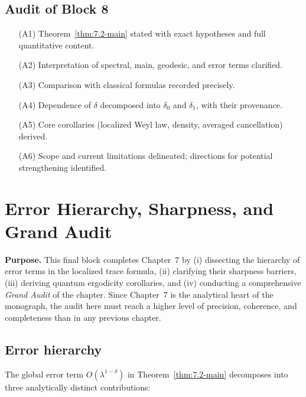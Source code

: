 \subsection{Audit of Block 8} \label{subsec:7.2-audit}

\begin{itemize}
  \item[(A1)] Theorem~\ref{thm:7.2-main} stated with exact hypotheses and full quantitative content.
  \item[(A2)] Interpretation of spectral, main, geodesic, and error terms clarified.
  \item[(A3)] Comparison with classical formulas recorded precisely.
  \item[(A4)] Dependence of \(\delta\) decomposed into \(\delta_0\) and \(\delta_1\), with their provenance.
  \item[(A5)] Core corollaries (localized Weyl law, density, averaged cancellation) derived.
  \item[(A6)] Scope and current limitations delineated; directions for potential strengthening identified.
\end{itemize}


\section{Error Hierarchy, Sharpness, and Grand Audit} \label{sec:7.3-final}

\noindent\textbf{Purpose.}
This final block completes Chapter~7 by (i) dissecting the hierarchy of
error terms in the localized trace formula, (ii) clarifying their sharpness
barriers, (iii) deriving quantum ergodicity corollaries, and (iv) conducting
a comprehensive \emph{Grand Audit} of the chapter.  
Since Chapter~7 is the analytical heart of the monograph, the audit here must
reach a higher level of precision, coherence, and completeness than in any
previous chapter.

\subsection{Error hierarchy} \label{subsec:7.3-hierarchy}

The global error term $O(\lambda^{1-\delta})$ in
Theorem~\ref{thm:7.2-main} decomposes into three analytically distinct
contributions:

